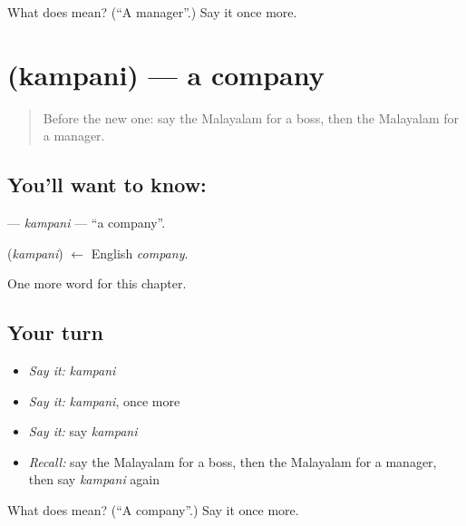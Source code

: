 \begin{tcolorbox}[breakable,colback=teal!4,colframe=teal!35!black,title={Before you move on}]
What does  mean? (\textquotedblleft{}A manager\textquotedblright{}.) Say it once more.
\end{tcolorbox}
\section[\texorpdfstring{\ml{കമ്പനി} (kampani)}{കമ്പനി (kampani)}]{ (kampani) — a company}

\label{lesson:ML-C334-kampani}



\begin{quote}
Before the new one: say the Malayalam for a boss, then the Malayalam for a manager.
\end{quote}

\subsection*{You'll want to know: }
\textbf{} — \emph{kampani} — \textquotedblleft{}a company\textquotedblright{}.

\begin{cousinweb}
\textbf{} (\emph{kampani}) $\leftarrow$ English \emph{company}.
\end{cousinweb}

\begin{grammarlens}[title={What you've built}]
One more word for this chapter.
\end{grammarlens}

\subsection*{Your turn}
\begin{itemize}
\raggedright
  \item \emph{Say it:} \emph{kampani}
  \item \emph{Say it:} \emph{kampani}, once more
  \item \emph{Say it:} say \emph{kampani}
  \item \emph{Recall:} say the Malayalam for a boss, then the Malayalam for a manager, then say \emph{kampani} again
\end{itemize}

\begin{tcolorbox}[breakable,colback=teal!4,colframe=teal!35!black,title={Before you move on}]
What does  mean? (\textquotedblleft{}A company\textquotedblright{}.) Say it once more.
\end{tcolorbox}
